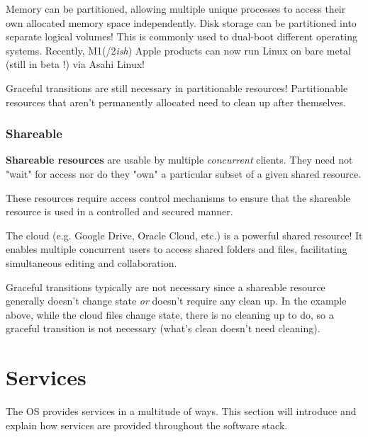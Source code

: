 \documentclass{article}
\begin{document}
\begin{tcolorbox}[colback=blue!5!white,colframe=black!75!blue,title=Example: Memory Mania and Disk Division]
  Memory can be partitioned, allowing multiple unique processes to access their own allocated memory
  space independently.
  \tcblower
  Disk storage can be partitioned into separate logical volumes! This is commonly used to dual-boot
  different operating systems. Recently, M1(/2\textit{ish}) Apple products can now run Linux on
  bare metal (still in beta !) via Asahi Linux!
\end{tcolorbox}

Graceful transitions are still necessary in partitionable resources! Partitionable resources that
aren't permanently allocated need to clean up after themselves.


\subsubsection{Shareable}

\begin{tcolorbox}[title=Definition: Shareable Resource]
  \textbf{Shareable resources} are usable by multiple \textit{concurrent} clients. They need not
  "wait" for access nor do they "own" a particular subset of a given shared resource. 
\end{tcolorbox}

These resources require access control mechanisms to ensure that the shareable resource is used in a
controlled and secured manner.

\begin{tcolorbox}[colback=blue!5!white,colframe=black!75!blue,title=Example: Cloud Crazy] 
  The cloud (e.g. Google Drive, Oracle Cloud, etc.) is a powerful shared resource! It enables
  multiple concurrent users to access shared folders and files, facilitating simultaneous editing
  and collaboration.
\end{tcolorbox}

Graceful transitions typically are not necessary since a shareable resource generally doesn't change
state \textit{or} doesn't require any clean up. In the example above, while the cloud files change
state, there is no cleaning up to do, so a graceful transition is not necessary (what's clean
doesn't need cleaning).





\section{Services}
The OS provides services in a multitude of ways. This section will introduce and explain how
services are provided throughout the software stack.
\end{document}
